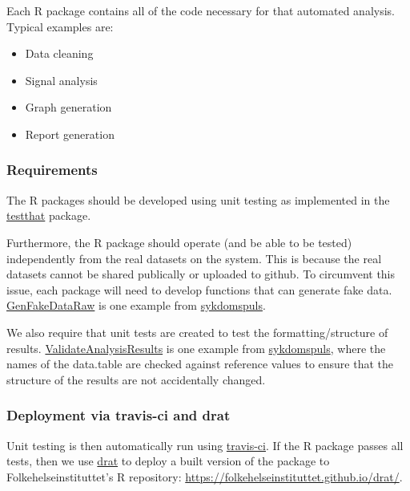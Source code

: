 \documentclass[12pt,]{article}
\providecommand{\tightlist}{%
  \setlength{\itemsep}{0pt}\setlength{\parskip}{0pt}}
\begin{document}
Each R package contains all of the code necessary for that automated
analysis. Typical examples are:

\begin{itemize}
\tightlist
\item
  Data cleaning
\item
  Signal analysis
\item
  Graph generation
\item
  Report generation
\end{itemize}

\subsubsection{Requirements}\label{requirements}

The R packages should be developed using unit testing as implemented in
the \href{http://r-pkgs.had.co.nz/tests.html}{testthat} package.

Furthermore, the R package should operate (and be able to be tested)
independently from the real datasets on the system. This is because the
real datasets cannot be shared publically or uploaded to github. To
circumvent this issue, each package will need to develop functions that
can generate fake data.
\href{https://folkehelseinstituttet.github.io/dashboards_sykdomspuls/reference/GenFakeDataRaw.html}{GenFakeDataRaw}
is one example from
\href{https://folkehelseinstituttet.github.io/dashboards_sykdomspuls/}{sykdomspuls}.

We also require that unit tests are created to test the
formatting/structure of results.
\href{https://folkehelseinstituttet.github.io/dashboards_sykdomspuls/reference/ValidateAnalysisResults.html}{ValidateAnalysisResults}
is one example from
\href{https://folkehelseinstituttet.github.io/dashboards_sykdomspuls/}{sykdomspuls},
where the names of the data.table are checked against reference values
to ensure that the structure of the results are not accidentally
changed.

\subsubsection{Deployment via travis-ci and
drat}\label{deployment-via-travis-ci-and-drat}

Unit testing is then automatically run using
\href{http://r-pkgs.had.co.nz/check.html\#travis}{travis-ci}. If the R
package passes all tests, then we use
\href{https://github.com/eddelbuettel/drat}{drat} to deploy a built
version of the package to Folkehelseinstituttet's R repository:
\url{https://folkehelseinstituttet.github.io/drat/}.
\end{document}
